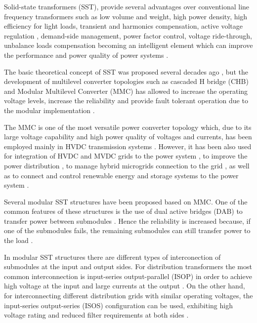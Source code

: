 \documentclass[conference]{IEEEtran}
\begin{document}
Solid-state transformers (SST), provide several advantages over  conventional line frequency transformers such as low volume and weight, high  power density, high efficiency for light loads, transient and harmonics compensation, active voltage regulation \cite{7951721}, demand-side management, power factor control, voltage ride-through,  unbalance loads compensation  becoming an  intelligent element which can  improve the performance and power quality of power systems \cite{7497683}.

 

 
The basic theoretical concept of SST was proposed several decades ago  \cite{7575768}, but the development of multilevel converter topologies such as cascaded H bridge (CHB) and Modular Multilevel Converter (MMC) has allowed to increase the operating voltage levels, increase the reliability and provide fault tolerant operation due to the modular implementation \cite{5482117, Malinowski}. 


The MMC is one of the most versatile power converter topology which, due to its large voltage capability and high power quality of voltages and currents, has been employed mainly in HVDC transmission systems  \cite{6757004}. However,  it has been also  used  for  integration of HVDC   and  MVDC grids to the power system \cite{7482715, 7742996}, to improve the power distribution \cite{7460260}, to manage hybrid microgrids connection to the grid \cite{6584014}, as well as to connect and control renewable energy and storage systems to the power system \cite{7920367}.

Several modular SST structures have been proposed based on MMC. One of the common features of these structures is the use of  dual active bridges (DAB) to transfer power between submodules \cite{8430592}. Hence the reliability is increased because, if one of the submodules fails, the remaining submodules can still transfer power to the load  \cite{6661455}. 

In modular SST structures there are different types of interconection of submodules at the input and output sides. For distribution transformers the most common interconnection is input-series output-parallel (ISOP) in order to achieve high voltage at the input and large currents at the output \cite{7792816}. On the other hand, for interconnecting different distribution grids with similar operating voltages, the  input-series  output-series (ISOS) configuration can be used, exhibiting high voltage rating and reduced filter requirements at both sides \cite{7088624, 5739137}.
\end{document}
